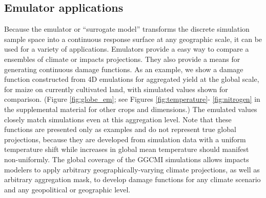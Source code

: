 \documentclass[preprint, 5p, times, twocolumn]{elsarticle}
\begin{document}
\subsection{Emulator applications}
Because the emulator or ``surrogate model'' transforms the discrete simulation sample space into a continuous response surface at any geographic scale, it can be used for a variety of applications. Emulators provide a easy way to compare a ensembles of climate or impacts projections. They also provide a means for generating continuous damage functions. As an example, we show a damage function constructed from 4D emulations for aggregated yield at the global scale, for maize on currently cultivated land, with simulated values shown for comparison. (Figure \ref{fig:globe_em};  see Figures \ref{fig:temperature}- \ref{fig:nitrogen} in the supplemental material for other crops and dimensions.) The emulated values closely match simulations even at this aggregation level. Note that these functions are presented only as examples and do not represent true global projections, because they are developed from simulation data with a uniform temperature shift while increases in global mean temperature should manifest non-uniformly. The global coverage of the GGCMI simulations allows impacts modelers to apply arbitrary geographically-varying climate projections, as well as arbitrary aggregation mask, to develop damage functions for any climate scenario and any geopolitical or geographic level.
\end{document}
